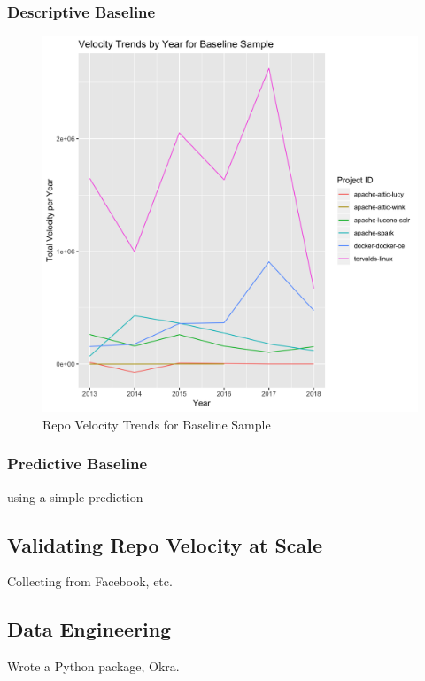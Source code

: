 \documentclass{article}
\begin{document}
\subsubsection{Descriptive Baseline}

\begin{figure}[h]
  \centering
  \includegraphics[scale=0.15]{f3}
  \caption{Repo Velocity Trends for Baseline Sample}
  \label{fig:desc_baseline}
  \end{figure}

\subsubsection{Predictive Baseline}

using a simple prediction

\subsection{Validating Repo Velocity at Scale}

Collecting from Facebook, etc.

\subsection{Data Engineering}

Wrote a Python package, Okra.
\end{document}

